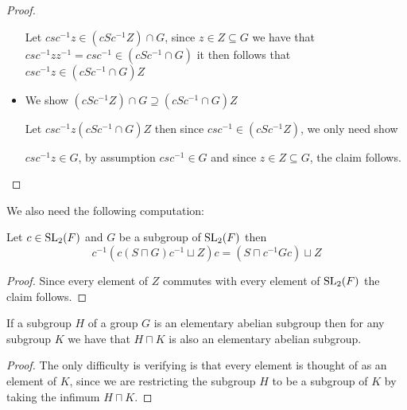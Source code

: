 \begin{footnotesize}
\begin{proof}
\begin{itemize}
  Let $csc^{-1}z \in (cSc^{-1}Z) \cap G$, since $z \in Z \subseteq G$ we have that $csc^{-1}zz^{-1} = csc^{-1} \in (cSc^{-1} \cap G)$
  it then follows that $csc^{-1}z \in (cSc^{-1} \cap G)Z$

  
  \item We show $(cSc^{-1}Z) \cap G \supseteq (cSc^{-1} \cap G)Z$
  
  Let $csc^{-1}z (cSc^{-1} \cap G)Z$ then since $csc^{-1} \in (cSc^{-1}Z)$, we only need show

  $csc^{-1}z \in G$, by assumption $csc^{-1} \in G$ and since $z \in Z\subseteq G$, the claim follows.  
\end{itemize}
\end{proof}



We also need the following computation:

\begin{lemma}
\label{MaximalAbelianSubgroup.conj_inv_conj_eq}
\leanok
Let $c \in \operatorname{SL}_2(F)$ and $G$ be a subgroup of $\operatorname{SL}_2(F)$ then 
\[
c^{-1}(c(S \sqcap G)c^{-1} \sqcup Z)c = (S \sqcap c^{-1}Gc) \sqcup Z
\]
\end{lemma}
\begin{proof}
  \leanok
  Since every element of $Z$ commutes with every element of $\operatorname{SL}_2(F)$ the claim follows.
\end{proof}


\begin{corollary}
  \label{IsElementaryAbelian.subgroupOf}
  \leanok
  If a subgroup $H$ of a group $G$ is an elementary abelian subgroup then 
  for any subgroup $K$ we have that $H \sqcap K$ is also an elementary abelian subgroup.
\end{corollary}
\begin{proof}
\leanok
The only difficulty is verifying is that every element is thought of as an element of $K$, since we are
restricting the subgroup $H$ to be a subgroup of $K$ by taking the infimum $H \sqcap K$. 
\end{proof}




\end{footnotesize}
